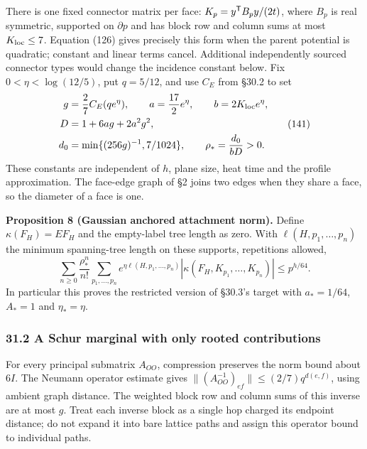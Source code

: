 \documentclass[11pt,a4paper]{article}
\begin{document}
There is one fixed connector matrix per face:
\(K_p=y^{\sf T}B_py/(2t)\), where \(B_p\) is real symmetric, supported
on \(\partial p\) and has block row and column sums at most
\(K_{\rm loc}\le7\). Equation (126) gives precisely this form when the
parent potential is quadratic; constant and linear terms cancel.
Additional independently sourced connector types would change the
incidence constant below. Fix \(0<\eta<\log(12/5)\), put \(q=5/12\), and
use \(C_E\) from §30.2 to set \[\begin{aligned}
g&=\frac27 C_E(qe^\eta),\qquad
a=\frac{17}2e^\eta,\qquad b=2K_{\rm loc}e^\eta,\\
D&=1+6ag+2a^2g^2,\\
d_0&=\min\{(256g)^{-1},7/1024\},\qquad
\rho_*=\frac{d_0}{bD}>0.
\end{aligned}\tag{141}\] These constants are independent of \(h\), plane
size, heat time and the profile approximation. The face-edge graph of §2
joins two edges when they share a face, so the diameter of a face is
one.

\textbf{Proposition 8 (Gaussian anchored attachment norm).} Define
\(\kappa(F_H)=EF_H\) and the empty-label tree length as zero. With
\(\ell(H,p_1,\ldots,p_n)\) the minimum spanning-tree length on these
supports, repetitions allowed, \[\sum_{n\ge0}\frac{\rho_*^n}{n!}
 \sum_{p_1,\ldots,p_n}
 e^{\eta\ell(H,p_1,\ldots,p_n)}
 |\kappa(F_H,K_{p_1},\ldots,K_{p_n})|
\le p^{h/64}.\tag{142}\] In particular this proves the restricted
version of §30.3's target with \(a_*=1/64\), \(A_*=1\) and
\(\eta_*=\eta\).

\hypertarget{a-schur-marginal-with-only-rooted-contributions}{%
\subsubsection{31.2 A Schur marginal with only rooted
contributions}\label{a-schur-marginal-with-only-rooted-contributions}}

For every principal submatrix \(A_{OO}\), compression preserves the norm
bound about \(6I\). The Neumann operator estimate gives
\(\|(A_{OO}^{-1})_{ef}\|\le(2/7)q^{d(e,f)}\), using ambient graph
distance. The weighted block row and column sums of this inverse are at
most \(g\). Treat each inverse block as a single hop charged its
endpoint distance; do not expand it into bare lattice paths and assign
this operator bound to individual paths.
\end{document}
